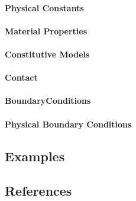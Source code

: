 \paragraph{Physical Constants}
\paragraph{Material Properties}
\paragraph{Constitutive Models}
\paragraph{Contact}
\paragraph{BoundaryConditions}
\paragraph{Physical Boundary Conditions}

\subsection{Examples}

\subsection{References}
